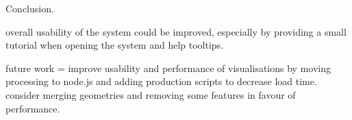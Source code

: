 
Conclusion.

overall usability of the system could be improved, especially by providing a small tutorial when opening the system and help tooltips.

future work = improve usability and performance of visualisations by moving processing to node.js and adding production scripts to decrease load time. consider merging geometries and removing some features in favour of performance.
